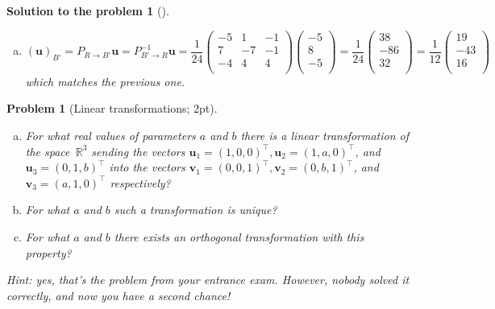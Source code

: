 \documentclass[12pt,a4]{article}
\newtheorem{problem}{Problem}
\newtheorem{solution}{Solution to the problem}
\newcommand{\bu}{{\mathbf u}}
\newcommand{\bv}{{\mathbf v}}
\begin{document}
\begin{solution}[]
\begin{enumerate}[(a)]
\[\]
\item
\[
(\bu)_{B'} = P_{R \to B'} \bu = 
P_{B' \to R}^{-1} \bu =  \frac{1}{24}
\begin{pmatrix}
-5 &  1 & -1 \\
7  & -7 &  -1 \\
-4  &  4 &  4 \\
\end{pmatrix}
\begin{pmatrix}-5\\8\\-5\\\end{pmatrix} = \frac{1}{24}
\begin{pmatrix}38\\-86\\32\\\end{pmatrix} = \frac{1}{12}
\begin{pmatrix}19\\-43\\16\\\end{pmatrix} 
\]
which matches the previous one.
\end{enumerate}
\end{solution}

\begin{problem}[Linear transformations; 2pt]\rm
	\begin{enumerate}[(a)]
		\item For what real values of parameters $a$ and $b$ there is a linear transformation of the space~$\mathbb{R}^3$ sending the vectors $\bu_1 = (1,0,0)^\top,\bu_2 = (1,a,0)^\top$, and $\bu_3 = (0,1,b)^\top$ into the vectors $\bv_1 = (0,0,1)^\top, \bv_2 = (0,b,1)^\top$, and $\bv_3 = (a,1,0)^\top$ respectively?
		\item For what $a$ and $b$ such a transformation is unique?
		\item For what $a$ and $b$ there exists an orthogonal transformation with this property?
	\end{enumerate}

	 \small{\textsf{Hint: yes, that's the problem from your entrance exam. However, nobody solved it correctly, and now you have a second chance!}}
\end{problem}
\end{document}
